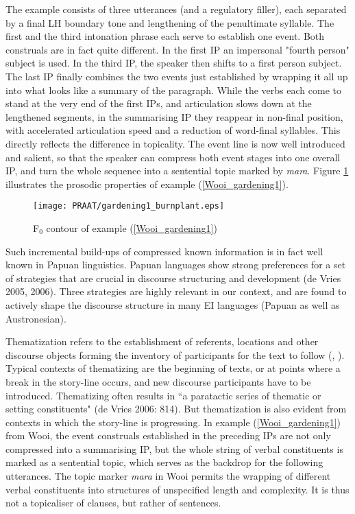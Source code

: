 The example consists of three utterances (and a regulatory filler), each separated by a final LH boundary tone and lengthening of the penultimate syllable. The first and the third intonation phrase each serve to establish one event. Both construals are in fact quite different. In the first IP an impersonal "fourth person" subject is used. In the third IP, the speaker then shifts to a first person subject. The last IP finally combines the two events just established by wrapping it all up into what looks like a summary of the paragraph. While the verbs each come to stand at the very end of the first IPs, and articulation slows down at the lengthened segments, in the summarising IP they reappear in non-final position, with accelerated articulation speed and a reduction of word-final syllables. This directly reflects the difference in topicality. The event line is now well introduced and salient, so that the speaker can compress both event stages into one overall IP, and turn the whole sequence into a sentential topic marked by \textit{mara}. Figure \ref{fig:gardening_pitch} illustrates the prosodic properties of example (\ref{Wooi_gardening1}).

\begin{figure}

\texttt{[image: PRAAT/gardening1\_burnplant.eps]} 
\caption{F$_0$ contour of example (\ref{Wooi_gardening1})}\label{fig:gardening_pitch}

\end{figure}


Such incremental build-ups of compressed known information is in fact well known in Papuan linguistics. Papuan languages show strong preferences for a set of strategies that are crucial in discourse structuring and development (de Vries 2005, 2006). Three strategies are highly relevant in our context, and are found to actively shape the discourse structure in many EI languages (Papuan as well as Austronesian). 

Thematization refers to the establishment of referents, locations and other discourse objects forming the inventory of participants for the text to follow (\cite{heeschen1998eipo}, \cite{devries2006areal}). Typical contexts of thematizing are the beginning of texts, or at points where a break in the story-line occurs, and new discourse participants have to be introduced. Thematizing often results in ``a paratactic series of thematic or setting constituents" (de Vries 2006: 814). But thematization is also evident from contexts  in which the story-line is progressing. In example (\ref{Wooi_gardening1}) from Wooi, the event construals established in the preceding IPs are not only compressed into a summarising IP, but the whole string of verbal constituents is marked as a sentential topic, which serves as the backdrop for the following utterances. The topic marker \textit{mara} in Wooi permits the wrapping of different verbal constituents into structures of unspecified length and complexity. It is thus not a topicaliser of clauses, but rather of sentences.

